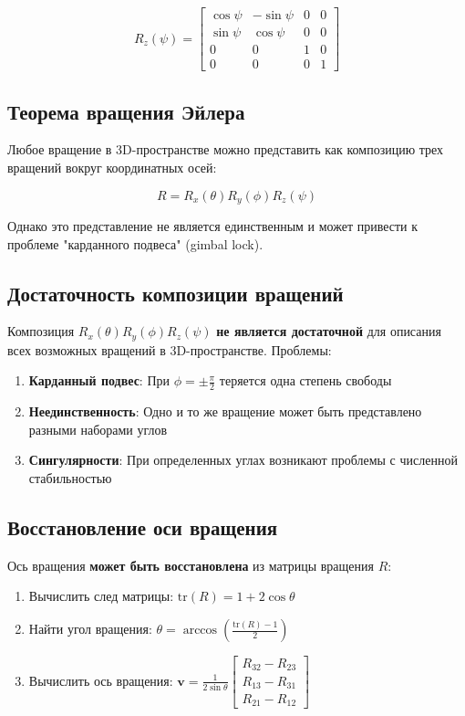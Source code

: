 \begin{equation}
R_z(\psi) = \begin{bmatrix}
\cos\psi & -\sin\psi & 0 & 0 \\
\sin\psi & \cos\psi & 0 & 0 \\
0 & 0 & 1 & 0 \\
0 & 0 & 0 & 1
\end{bmatrix}
\end{equation}

\subsection*{Теорема вращения Эйлера}

Любое вращение в 3D-пространстве можно представить как композицию трех вращений вокруг координатных осей:

\begin{equation}
R = R_x(\theta) R_y(\phi) R_z(\psi)
\end{equation}

Однако это представление не является единственным и может привести к проблеме "карданного подвеса" (gimbal lock).

\subsection*{Достаточность композиции вращений}

Композиция $R_x(\theta) R_y(\phi) R_z(\psi)$ \textbf{не является достаточной} для описания всех возможных вращений в 3D-пространстве. Проблемы:

\begin{enumerate}
\item \textbf{Карданный подвес}: При $\phi = \pm \frac{\pi}{2}$ теряется одна степень свободы
\item \textbf{Неединственность}: Одно и то же вращение может быть представлено разными наборами углов
\item \textbf{Сингулярности}: При определенных углах возникают проблемы с численной стабильностью
\end{enumerate}

\subsection*{Восстановление оси вращения}

Ось вращения \textbf{может быть восстановлена} из матрицы вращения $R$:

\begin{enumerate}
\item Вычислить след матрицы: $\text{tr}(R) = 1 + 2\cos\theta$
\item Найти угол вращения: $\theta = \arccos\left(\frac{\text{tr}(R) - 1}{2}\right)$
\item Вычислить ось вращения: $\mathbf{v} = \frac{1}{2\sin\theta} \begin{bmatrix} R_{32} - R_{23} \\ R_{13} - R_{31} \\ R_{21} - R_{12} \end{bmatrix}$
\end{enumerate}


